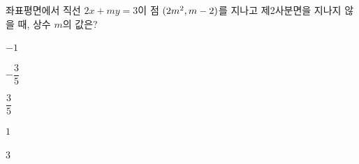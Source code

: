 좌표평면에서 직선 $2x+my=3$이 점 $(2m^2{,}\mkern3mu m-2)$를 지나고 제2사분면을 지나지 않을 때, 상수 $m$의 값은?
\begin{choices32}{\rule[-3ex]{0pt}{8ex}$-1$}{\rule[-3ex]{0pt}{8ex}$-\dfrac{3}{5}$}{\rule[-3ex]{0pt}{8ex}$\dfrac{3}{5}$}{\rule[-3ex]{0pt}{8ex}$1$}{\rule[-3ex]{0pt}{8ex}$3$}\end{choices32}
